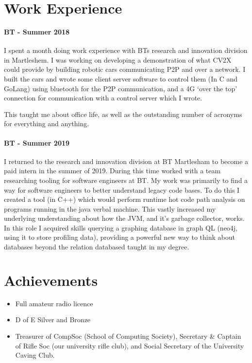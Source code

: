 \documentclass[9pt,a4paper]{article}
\begin{document}
\begin{multicols*}{3}
\section*{Work Experience}

\paragraph{BT - Summer 2018} I spent a month doing work experience with BTs research and innovation division in Martleshem.
I was working on developing a demonstration of what CV2X could provide by building robotic cars communicating P2P and over a network.
I built the cars and wrote some client server software to control them (In C and GoLang) using bluetooth for the P2P communication, and a 4G `over the top' connection for communication with a control server which I wrote.

This taught me about office life, as well as the outstanding number of acronyms for everything and anything.

\paragraph{BT - Summer 2019} I returned to the research and innovation division at BT Martlesham to become a paid intern in the summer of 2019.
During this time worked with a team researching tooling for software engineers at BT.
My work was primarily to find a way for software engineers to better understand legacy code bases.
To do this I created a tool (in C++) which would perform runtime hot code path analysis on programs running in the java verbal machine.
This vastly increased my underlying understanding about how the JVM, and it's garbage collector, works.
In this role I acquired skills querying a graphing database in graph QL (neo4j, using it to store profiling data), providing a powerful new way to think about databases beyond the relation databased taught in my degree.

\section*{Achievements}
\begin{itemize}
	\item Full amateur radio licence

	\item D of E Silver and Bronze

  \item Treasurer of CompSoc (School of Computing Society), Secretary \& Captain of Rifle Soc (our university rifle club), and Social Secretary of the University Caving Club.


\end{itemize}
\end{multicols*}
\end{document}
